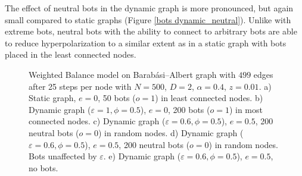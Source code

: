 \documentclass[11pt]{article}
\begin{document}
The effect of neutral bots in the dynamic graph is more pronounced, but again small compared to static graphs (Figure \ref{bots dynamic_neutral}). Unlike with extreme bots, neutral bots with the ability to connect to arbitrary bots are able to reduce hyperpolarization to a similar extent as in a  static graph with bots placed in the least connected nodes. 

\begin{figure}[h] 

\caption{Weighted Balance model on Barabási–Albert graph with $499$ edges after 25 steps per node with $N=500$, $D=2$, $\alpha=0.4$, $z=0.01$. a) Static graph, $e=0$, 50 bots ($o=1$) in least connected nodes. b) Dynamic graph ($\varepsilon=1,\phi=0.5$), $e=0$, 200 bots ($o=1$) in most connected nodes. c) Dynamic graph ($\varepsilon=0.6,\phi=0.5$), $e=0.5$, 200 neutral bots ($o=0$) in random nodes.
d) Dynamic graph ($\varepsilon=0.6,\phi=0.5$), $e=0.5$, 200 neutral bots ($o=0$) in random nodes. Bots unaffected by $\varepsilon$.
e) Dynamic graph ($\varepsilon=0.6,\phi=0.5$), $e=0.5$, no bots.
}
\label{samplemodels}
\end{figure}
\end{document}
